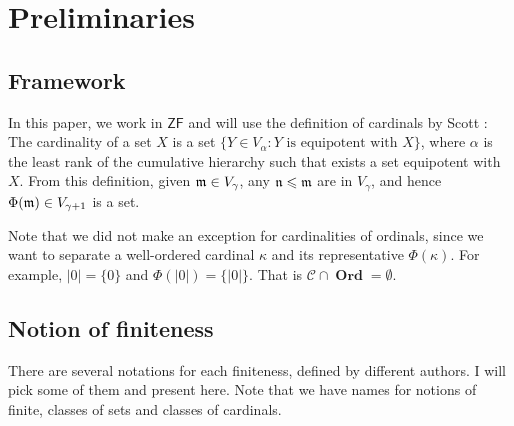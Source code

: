 \documentclass{amsart}
\newcommand{\ZF}{\ensuremath{\mathsf{ZF}}}
\newcommand{\CFin}{\mathscr{C}}
\DeclareMathOperator{\Ord}{\textbf{Ord}}
\renewcommand{\leq}{\leqslant}
\newcommand{\1}{\ensuremath{\mathds{1}}}
\theoremstyle{plain}
\theoremstyle{boldrk}
\theoremstyle{definition}
\begin{document}
\section{Preliminaries}\label{s:preliminaries}

\subsection{Framework}

In this paper, we work in $\ZF$ and will use the definition of cardinals by Scott \cite{Scott}: The cardinality of a set $X$ is a set $\{Y\in V_{\alpha}:Y\text{ is equipotent with }X\}$, where $\alpha$ is the least rank of the cumulative hierarchy such that exists a set equipotent with $X$. From this definition, given $\frak{m}\in V_{\gamma}$, any $\frak{n}\leq\frak{m}$ are in $V_{\gamma}$, and hence $\Phi(\frak{m})\in V_{\gamma+1}$ is a set.  

Note that we did not make an exception for cardinalities of ordinals, since we want to separate a well-ordered cardinal $\kappa$ and its representative $\Phi(\kappa)$. For example, $|0|=\{0\}$ and $\Phi(|0|)=\{|0|\}$. That is $\CFin\cap\Ord=\emptyset$.

\subsection{Notion of finiteness}

There are several notations for each finiteness, defined by different authors. I will pick some of them and present here. Note that we have names for notions of finite, classes of sets and classes of cardinals.
\end{document}
